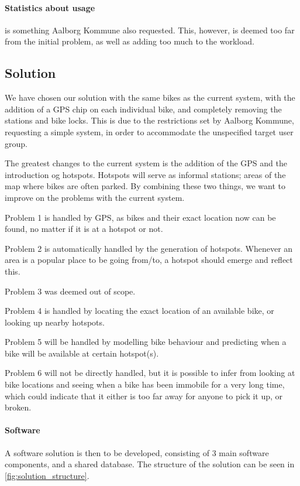 \paragraph{Statistics about usage} is something Aalborg Kommune also requested.
This, however, is deemed too far from the initial problem, as well as adding too much to the workload.

\subsection{Solution}
We have chosen our solution with the same bikes as the current system, with the addition of a GPS chip on each individual bike, and completely removing the stations and bike locks.
This is due to the restrictions set by Aalborg Kommune, requesting a simple system, in order to accommodate the unspecified target user group.

The greatest changes to the current system is the addition of the GPS and the introduction og hotspots.
Hotspots will serve as informal stations; areas of the map where bikes are often parked.
By combining these two things, we want to improve on the problems with the current system.

Problem 1 is handled by GPS, as bikes and their exact location now can be found, no matter if it is at a hotspot or not.

Problem 2 is automatically handled by the generation of hotspots.
Whenever an area is a popular place to be going from/to, a hotspot should emerge and reflect this.

Problem 3 was deemed out of scope.

Problem 4 is handled by locating the exact location of an available bike, or looking up nearby hotspots.

Problem 5 will be handled by modelling bike behaviour and predicting when a bike will be available at certain hotspot(s).

Problem 6 will not be directly handled, but it is possible to infer from looking at bike locations and seeing when a bike has been immobile for a very long time, which could indicate that it either is too far away for anyone to pick it up, or broken.

\paragraph{Software}
A software solution is then to be developed, consisting of 3 main software components, and a shared database.
The structure of the solution can be seen in \cref{fig:solution_structure}.

